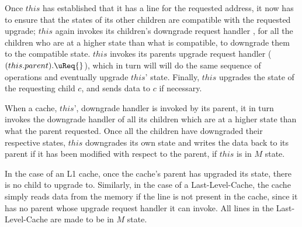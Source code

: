 Once $this$ has established that it has a line for the requested address, it now
has to ensure that the states of its other children are compatible with the
requested upgrade; $this$ again invokes its children's downgrade request handler
\dReq{}, for all the children who are at a higher state than what is compatible,
to downgrade them to the compatible state. $this$ invokes its parents upgrade
request handler ($(this.parent).\uReq{}$), which in turn will will do the same
sequence of operations and eventually upgrade $this$' state. Finally, $this$
upgrades the state of the requesting child $c$, and sends data to $c$ if
necessary.

When a cache, $this$', downgrade handler is invoked by its parent, it in turn
invokes the downgrade handler of all its children which are at a higher state
than what the parent requested. Once all the children have downgraded their
respective states, $this$ downgrades its own state and writes the data back to
its parent if it has been modified with respect to the parent, \ie if $this$ is
in $M$ state.

In the case of an L1 cache, once the cache's parent has upgraded its state,
there is no child to upgrade to. Similarly, in the case of a Last-Level-Cache,
the cache simply reads data from the memory if the line is not present in the
cache, since it has no parent whose upgrade request handler it can invoke. All
lines in the Last-Level-Cache are made to be in $M$ state.

